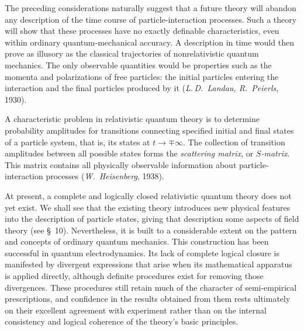 The preceding considerations naturally suggest that a future theory will abandon any description of the time course of particle-interaction processes. Such a theory will show that these processes have no exactly definable characteristics, even within ordinary quantum-mechanical accuracy. A description in time would then prove as illusory as the classical trajectories of nonrelativistic quantum mechanics. The only observable quantities would be properties such as the momenta and polarizations of free particles: the initial particles entering the interaction and the final particles produced by it (\emph{L.\,D.~Landau, R.~Peierls}, 1930).

A characteristic problem in relativistic quantum theory is to determine probability amplitudes for transitions connecting specified initial and final states of a particle system, that is, its states at $t \to \mp\infty$. The collection of transition amplitudes between all possible states forms the \emph{scattering matrix}, or \emph{$S$-matrix}. This matrix contains all physically observable information about particle-interaction processes (\emph{W.~Heisenberg}, 1938).

At present, a complete and logically closed relativistic quantum theory does not yet exist. We shall see that the existing theory introduces new physical features into the description of particle states, giving that description some aspects of field theory (see \S~10). Nevertheless, it is built to a considerable extent on the pattern and concepts of ordinary quantum mechanics. This construction has been successful in quantum electrodynamics. Its lack of complete logical closure is manifested by divergent expressions that arise when its mathematical apparatus is applied directly, although definite procedures exist for removing those divergences. These procedures still retain much of the character of semi-empirical prescriptions, and confidence in the results obtained from them rests ultimately on their excellent agreement with experiment rather than on the internal consistency and logical coherence of the theory's basic principles.
